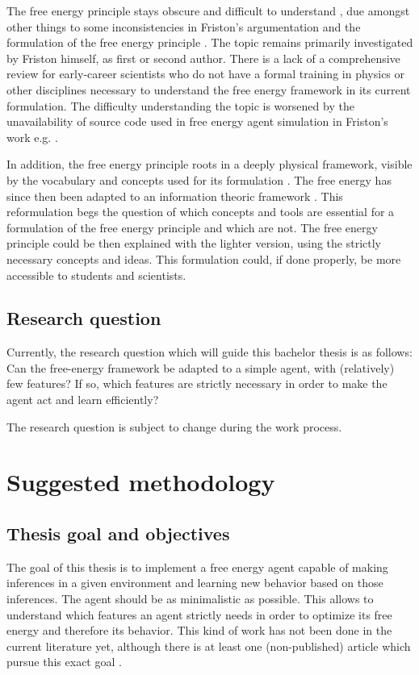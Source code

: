 \documentclass[11pt,
  paper=a4,
  bibliography=totocnumbered,
	captions=tableheading,
	BCOR=10mm
]{scrreprt}
\theoremstyle{definition}
\begin{document}
The free energy principle stays obscure and difficult to understand \cite{McGregor2015}, due amongst other things to some inconsistencies in Friston's argumentation and the formulation of the free energy principle \cite{Sims2016}. The topic remains primarily investigated by Friston himself, as first or second author. There is a lack of a comprehensive review for early-career scientists who do not have a formal training in physics or other disciplines necessary to understand the free energy framework in its current formulation. The difficulty understanding the topic is worsened by the unavailability of source code used in free energy agent simulation in Friston's work e.g. \cite{Cullen2018}.

In addition, the free energy principle roots in a deeply physical framework, visible by the vocabulary and concepts used for its formulation \cite{Friston2006}. The free energy has since then been adapted to an information theoric framework \cite{Friston2016}. This reformulation begs the question of which concepts and tools are essential for a formulation of the free energy principle and which are not. The free energy principle could be then explained with the lighter version, using the strictly necessary concepts and ideas. This formulation could, if done properly, be more accessible to students and scientists.

\section{Research question}

Currently, the research question which will guide this bachelor thesis is as follows: Can the free-energy framework be adapted to a simple agent, with (relatively) few features? If so, which features are strictly necessary in order to make the agent act and learn efficiently?

The research question is subject to change during the work process.

\chapter{Suggested methodology}

\section{Thesis goal and objectives}

The goal of this thesis is to implement a free energy agent capable of making inferences in a given environment and learning new behavior based on those inferences. The agent should be as minimalistic as possible. This allows to understand which features an agent strictly needs in order to optimize its free energy and therefore its behavior. This kind of work has not been done in the current literature yet, although there is at least one (non-published) article which pursue this exact goal \cite{McGregor2015}.
\end{document}
